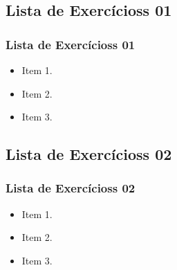 \subsection[Lista de Exercícioss 01]{Lista de Exercícioss 01}\label{subsec:listas-lista01}



\begin{frame}[t]\frametitle{Lista de Exercícioss 01}

  \begin{itemize}
    \justifying{}
    \setlength\itemsep{1em}
    \item Item 1.
    \item Item 2.
    \item Item 3.
  \end{itemize}

\end{frame}



\subsection[Lista de Exercícioss 02]{Lista de Exercícioss 02}\label{subsec:listas-lista02}



\begin{frame}[t]\frametitle{Lista de Exercícioss 02}
  
  \begin{itemize}
    \justifying{}
    \setlength\itemsep{1em}
    \item Item 1.
    \item Item 2.
    \item Item 3.
  \end{itemize}
  
\end{frame}
